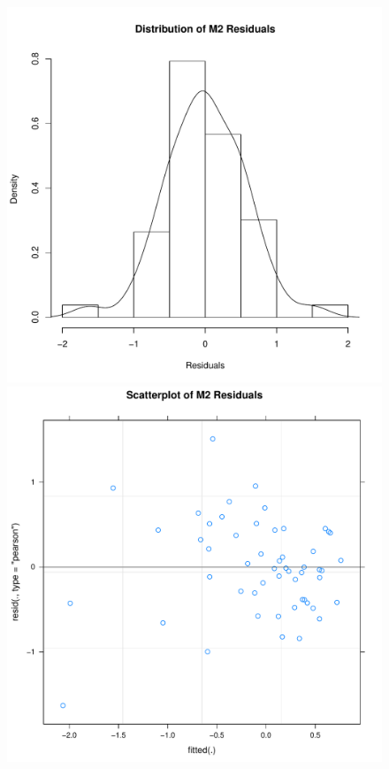 \begin{figure}[htbp]
    \includegraphics[scale =.4]{images/TEM2Hist.pdf}
    \includegraphics[scale =.4]{images/TEM2Scatter.pdf}

\end{figure}
